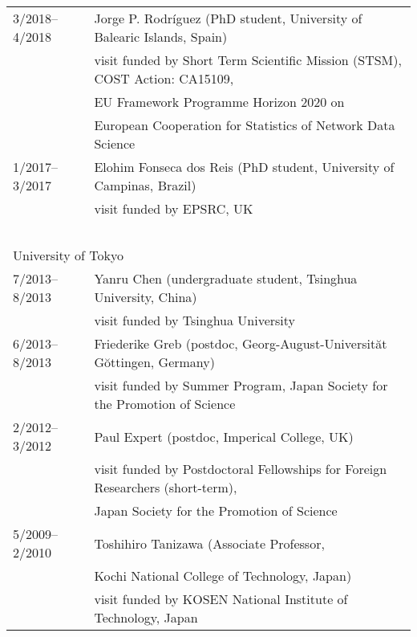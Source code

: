 \documentclass[11pt,letter]{article}
\renewenvironment{itemize}{
  \begin{list}{}{
    \setlength{\leftmargin}{1.5em}
    \setlength{\itemsep}{0.25em}
    \setlength{\parskip}{0pt}
    \setlength{\parsep}{0.25em}
  }
}{
  \end{list}
}
\begin{document}
\begin{itemize}
\begin{tabular}{ll}
3/2018--4/2018 & Jorge P. Rodr\'{i}guez (PhD student, University of Balearic Islands, Spain)\\
& visit funded by Short Term Scientific Mission (STSM), COST Action: CA15109,\\
& EU Framework Programme Horizon 2020 on\\
& European Cooperation for Statistics of Network Data Science\\

1/2017--3/2017 & Elohim Fonseca dos Reis (PhD student, University of Campinas, Brazil)\\
& visit funded by EPSRC, UK\\


\ \\
\multicolumn{2}{l}{University of Tokyo}\\[1.5mm]
7/2013--8/2013 & Yanru Chen (undergraduate student, Tsinghua University, China)\\
& visit funded by Tsinghua University\\

6/2013--8/2013 & Friederike Greb (postdoc, Georg-August-Universit\u{a}t G\u{o}ttingen, Germany)\\
& visit funded by Summer Program, Japan Society for the Promotion of Science\\

2/2012--3/2012 & Paul Expert (postdoc, Imperical College, UK)\\
& visit funded by Postdoctoral Fellowships for Foreign Researchers (short-term),\\
& Japan Society for the Promotion of Science\\

5/2009--2/2010 & Toshihiro Tanizawa
(Associate Professor,\\
& Kochi National College of Technology, Japan)\\
& visit funded by KOSEN National Institute of Technology, Japan
\end{tabular}


\end{itemize}
\end{document}
